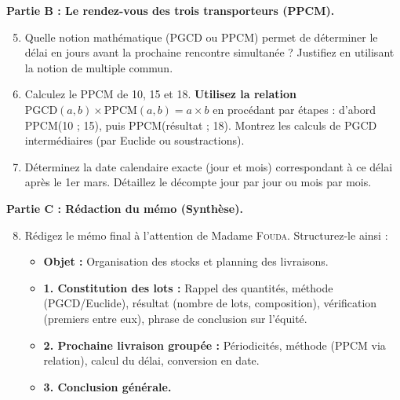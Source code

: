\documentclass[11pt]{article}
\newcommand{\cle}[1]{{\popxbold\color{popdark}#1}}
\begin{document}
\medskip
\noindent \textbf{Partie B : Le rendez-vous des trois transporteurs (PPCM).}
\begin{enumerate}
    \setcounter{enumi}{4}
    \item Quelle notion mathématique (PGCD ou PPCM) permet de déterminer le délai en jours avant la prochaine rencontre simultanée ? Justifiez en utilisant la notion de \cle{multiple commun}.
    \item Calculez le PPCM de 10, 15 et 18. \textbf{Utilisez la relation $\text{PGCD}(a,b) \times \text{PPCM}(a,b) = a \times b$} en procédant par étapes : d'abord PPCM(10 ; 15), puis PPCM(résultat ; 18). Montrez les calculs de PGCD intermédiaires (par Euclide ou soustractions).
    \item Déterminez la date calendaire exacte (jour et mois) correspondant à ce délai après le 1er mars. Détaillez le décompte jour par jour ou mois par mois.
\end{enumerate}

\medskip
\noindent \textbf{Partie C : Rédaction du mémo (Synthèse).}
\begin{enumerate}
    \setcounter{enumi}{7}
    \item Rédigez le mémo final à l'attention de Madame \textsc{Fouda}. Structurez-le ainsi :
    \begin{itemize}
        \item \textbf{Objet :} Organisation des stocks et planning des livraisons.
        \item \textbf{1. Constitution des lots :} Rappel des quantités, méthode (PGCD/Euclide), résultat (nombre de lots, composition), vérification (premiers entre eux), phrase de conclusion sur l'équité.
        \item \textbf{2. Prochaine livraison groupée :} Périodicités, méthode (PPCM via relation), calcul du délai, conversion en date.
        \item \textbf{3. Conclusion générale.}
    \end{itemize}
\end{enumerate}
\end{document}
